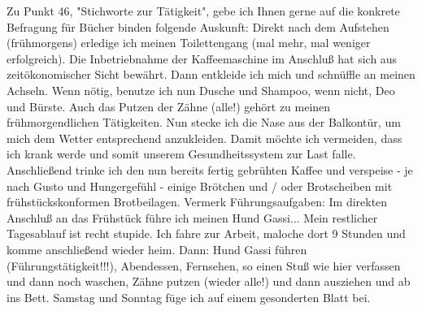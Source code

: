 Zu Punkt 46, "Stichworte zur Tätigkeit", gebe ich Ihnen gerne auf die konkrete Befragung für Bücher binden folgende Auskunft: Direkt nach dem Aufstehen (frühmorgens) erledige ich meinen Toilettengang (mal mehr, mal weniger erfolgreich). Die Inbetriebnahme der Kaffeemaschine im Anschluß hat sich aus zeitökonomischer Sicht bewährt. Dann entkleide ich mich und schnüffle an meinen Achseln. Wenn nötig, benutze ich nun Dusche und Shampoo, wenn nicht, Deo und Bürste. Auch das Putzen der Zähne (alle!) gehört zu meinen frühmorgendlichen Tätigkeiten. Nun stecke ich die Nase aus der Balkontür, um mich dem Wetter entsprechend anzukleiden. Damit möchte ich vermeiden, dass ich krank werde und somit unserem Gesundheitssystem zur Last falle. Anschließend trinke ich den nun bereits fertig gebrühten Kaffee und verspeise - je nach Gusto und Hungergefühl - einige Brötchen und / oder Brotscheiben mit frühstückskonformen Brotbeilagen. Vermerk Führungsaufgaben: Im direkten Anschluß an das Frühstück führe ich meinen Hund Gassi... Mein restlicher Tagesablauf ist recht stupide. Ich fahre zur Arbeit, maloche dort 9 Stunden und komme anschließend wieder heim. Dann: Hund Gassi führen (Führungstätigkeit!!!), Abendessen, Fernsehen, so einen Stuß wie hier verfassen und dann noch waschen, Zähne putzen (wieder alle!) und dann ausziehen und ab ins Bett. Samstag und Sonntag füge ich auf einem gesonderten Blatt bei.
